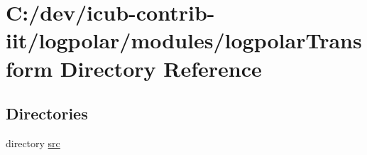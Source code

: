 \section{C\+:/dev/icub-\/contrib-\/iit/logpolar/modules/logpolar\+Transform Directory Reference}
\label{dir_570f4a234c06505f6ec71d919eb71faf}
\subsection*{Directories}
\begin{DoxyCompactItemize}
\item 
directory \hyperlink{dir_c8063af17756bf327be829ed75f65a59}{src}
\end{DoxyCompactItemize}

